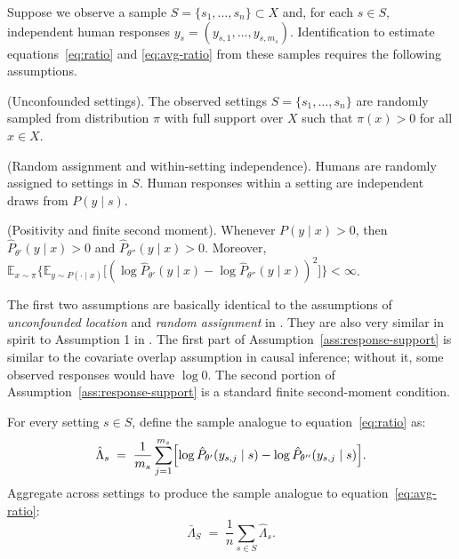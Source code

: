 Suppose we observe a sample $S=\{s_{1},\dots,s_{n}\}\subset X$ and, for each
$s \in S$, independent human responses $y_s=(y_{s,1},\dots,y_{s,m_s})$.
Identification to estimate equations~\ref{eq:ratio} and \ref{eq:avg-ratio} from these samples requires the following assumptions.

\begin{assumption}  \label{ass:rand-settings}
(Unconfounded settings).
The observed settings $S=\{s_{1},\dots,s_{n}\}$ are randomly sampled from distribution $\pi$ with full support over $X$ such that $\pi(x)>0$ for all $x \in X$.
\end{assumption}

\begin{assumption}\label{ass:rand-humans}
(Random assignment and within-setting independence).
Humans are randomly assigned to settings in $S$.
Human responses within a setting are independent draws from $P(y \mid s)$.
\end{assumption}

\begin{assumption} \label{ass:response-support}
(Positivity and finite second moment).
Whenever $P(y\mid x)>0$, then $\hat P_{\theta'}(y\mid x)>0$ and $\hat P_{\theta''}(y\mid x)>0$. 
Moreover, $\mathbb{E}_{x\sim\pi}\bigl\{\mathbb{E}_{y\sim P(\cdot\mid x)}\bigl[(\log\hat P_{\theta'}(y\mid x) - \log\hat P_{\theta''}(y\mid x))^{2}\bigr]\bigr\} < \infty$.
\end{assumption}

The first two assumptions are basically identical to the assumptions of \emph{unconfounded location} and \emph{random assignment} in \citeauthor{Hotz2005PredictingEfficacy}.
They are also very similar in spirit to Assumption 1 in \citeauthor{andrews2025transfer}.
The first part of Assumption~\ref{ass:response-support} is similar to the covariate overlap assumption in causal inference; without it, some observed responses would have $\log 0$.
The second portion of Assumption~\ref{ass:response-support} is a standard finite second-moment condition.

For every setting $s \in S$, define the sample analogue to equation~\ref{eq:ratio} as:
\begin{equation} \label{eq:sample-ratio}
\hat\Lambda_{s}
\;=\;
\frac1{m_s}
\sum_{j=1}^{m_s}
\Bigl[\log\hat P_{\theta'}(y_{s,j}\mid s)
-\log\hat P_{\theta''}(y_{s,j}\mid s)\Bigr].
\end{equation}
Aggregate across settings to produce the sample analogue to equation~\ref{eq:avg-ratio}:
\begin{equation} \label{eq:sample-avg-ratio}
\bar\Lambda_{S}
\;=\;
\frac1n\sum_{s \in S}\hat\Lambda_{s}.
\end{equation}

